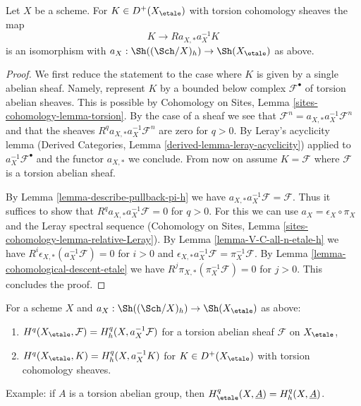 \begin{lemma}
\label{lemma-cohomological-descent-etale-h}
Let $X$ be a scheme. For $K \in D^+(X_\etale)$ with torsion cohomology
sheaves the map
$$
K \longrightarrow Ra_{X, *}a_X^{-1}K
$$
is an isomorphism with $a_X : \Sh((\Sch/X)_h) \to \Sh(X_\etale)$ as above.
\end{lemma}

\begin{proof}
We first reduce the statement to the case where
$K$ is given by a single abelian sheaf. Namely, represent $K$
by a bounded below complex $\mathcal{F}^\bullet$ of torsion
abelian sheaves. This is possible by Cohomology on Sites, Lemma
\ref{sites-cohomology-lemma-torsion}. By the case of a
sheaf we see that
$\mathcal{F}^n = a_{X, *} a_X^{-1} \mathcal{F}^n$
and that the sheaves $R^qa_{X, *}a_X^{-1}\mathcal{F}^n$
are zero for $q > 0$. By Leray's acyclicity lemma
(Derived Categories, Lemma \ref{derived-lemma-leray-acyclicity})
applied to $a_X^{-1}\mathcal{F}^\bullet$
and the functor $a_{X, *}$ we conclude. From now on assume $K = \mathcal{F}$
where $\mathcal{F}$ is a torsion abelian sheaf.

\medskip\noindent
By Lemma \ref{lemma-describe-pullback-pi-h} we have
$a_{X, *}a_X^{-1}\mathcal{F} = \mathcal{F}$. Thus it suffices to show that
$R^qa_{X, *}a_X^{-1}\mathcal{F} = 0$ for $q > 0$.
For this we can use $a_X = \epsilon_X \circ \pi_X$ and
the Leray spectral sequence
(Cohomology on Sites, Lemma \ref{sites-cohomology-lemma-relative-Leray}).
By Lemma \ref{lemma-V-C-all-n-etale-h}
we have $R^i\epsilon_{X, *}(a_X^{-1}\mathcal{F}) = 0$ for $i > 0$
and $\epsilon_{X, *}a_X^{-1}\mathcal{F} = \pi_X^{-1}\mathcal{F}$.
By Lemma \ref{lemma-cohomological-descent-etale} we have
$R^j\pi_{X, *}(\pi_X^{-1}\mathcal{F}) = 0$ for $j > 0$.
This concludes the proof.
\end{proof}

\begin{lemma}
\label{lemma-compare-cohomology-etale-h}
For a scheme $X$ and $a_X : \Sh((\Sch/X)_h) \to \Sh(X_\etale)$
as above:
\begin{enumerate}
\item $H^q(X_\etale, \mathcal{F}) = H^q_h(X, a_X^{-1}\mathcal{F})$
for a torsion abelian sheaf $\mathcal{F}$ on $X_\etale$,
\item $H^q(X_\etale, K) = H^q_h(X, a_X^{-1}K)$
for $K \in D^+(X_\etale)$ with torsion cohomology sheaves.
\end{enumerate}
Example: if $A$ is a torsion abelian group, then
$H^q_\etale(X, \underline{A}) = H^q_h(X, \underline{A})$.
\end{lemma}

